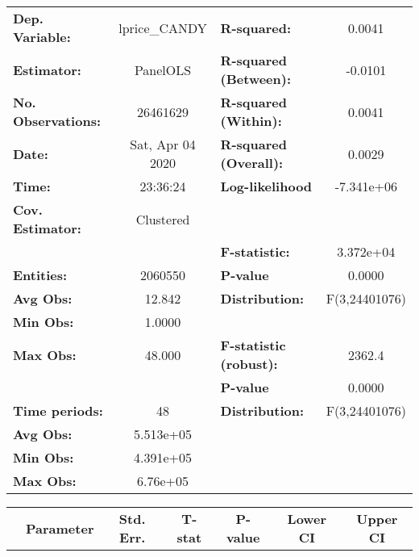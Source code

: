 \documentclass{report}
\begin{document}
\begin{center}
\begin{tabular}{lclc}
\toprule
\textbf{Dep. Variable:}    &   lprice\_CANDY    & \textbf{  R-squared:         }   &      0.0041      \\
\textbf{Estimator:}        &      PanelOLS      & \textbf{  R-squared (Between):}  &     -0.0101      \\
\textbf{No. Observations:} &      26461629      & \textbf{  R-squared (Within):}   &      0.0041      \\
\textbf{Date:}             &  Sat, Apr 04 2020  & \textbf{  R-squared (Overall):}  &      0.0029      \\
\textbf{Time:}             &      23:36:24      & \textbf{  Log-likelihood     }   &    -7.341e+06    \\
\textbf{Cov. Estimator:}   &     Clustered      & \textbf{                     }   &                  \\
\textbf{}                  &                    & \textbf{  F-statistic:       }   &    3.372e+04     \\
\textbf{Entities:}         &      2060550       & \textbf{  P-value            }   &      0.0000      \\
\textbf{Avg Obs:}          &       12.842       & \textbf{  Distribution:      }   &  F(3,24401076)   \\
\textbf{Min Obs:}          &       1.0000       & \textbf{                     }   &                  \\
\textbf{Max Obs:}          &       48.000       & \textbf{  F-statistic (robust):} &      2362.4      \\
\textbf{}                  &                    & \textbf{  P-value            }   &      0.0000      \\
\textbf{Time periods:}     &         48         & \textbf{  Distribution:      }   &  F(3,24401076)   \\
\textbf{Avg Obs:}          &     5.513e+05      & \textbf{                     }   &                  \\
\textbf{Min Obs:}          &     4.391e+05      & \textbf{                     }   &                  \\
\textbf{Max Obs:}          &      6.76e+05      & \textbf{                     }   &                  \\
\bottomrule
\end{tabular}
\begin{tabular}{lcccccc}
                           & \textbf{Parameter} & \textbf{Std. Err.} & \textbf{T-stat} & \textbf{P-value} & \textbf{Lower CI} & \textbf{Upper CI}  \\

\end{tabular}
\end{center}
\end{document}
